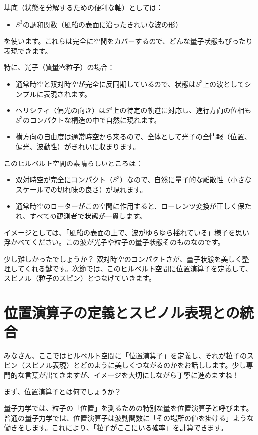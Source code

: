 \documentclass[dvipdfmx,12pt,a4paper]{article}
\begin{document}
基底（状態を分解するための便利な軸）としては：
\begin{itemize}
  \item $S^3$の調和関数（風船の表面に沿ったきれいな波の形）
\end{itemize}
を使います。これらは完全に空間をカバーするので、どんな量子状態もぴったり表現できます。

特に、光子（質量零粒子）の場合：
\begin{itemize}
  \item 通常時空と双対時空が完全に反同期しているので、状態は$S^3$上の波としてシンプルに表現されます。
  \item ヘリシティ（偏光の向き）は$S^3$上の特定の軌道に対応し、進行方向の位相も$S^3$のコンパクトな構造の中で自然に現れます。
  \item 横方向の自由度は通常時空から来るので、全体として光子の全情報（位置、偏光、波動性）がきれいに収まります。
\end{itemize}

このヒルベルト空間の素晴らしいところは：
\begin{itemize}
  \item 双対時空が完全にコンパクト（$S^3$）なので、自然に量子的な離散性（小さなスケールでの切れ味の良さ）が現れます。
  \item 通常時空のローターがこの空間に作用すると、ローレンツ変換が正しく保たれ、すべての観測者で状態が一貫します。
\end{itemize}

イメージとしては、「風船の表面の上で、波がゆらゆら揺れている」様子を思い浮かべてください。この波が光子や粒子の量子状態そのものなのです。

少し難しかったでしょうか？ 双対時空のコンパクトさが、量子状態を美しく整理してくれる鍵です。次節では、このヒルベルト空間に位置演算子を定義して、スピノル（粒子のスピン）とつなげていきます。

\section{位置演算子の定義とスピノル表現との統合}

みなさん、ここではヒルベルト空間に「位置演算子」を定義し、それが粒子のスピン（スピノル表現）とどのように美しくつながるのかをお話しします。少し専門的な言葉が出てきますが、イメージを大切にしながら丁寧に進めますね！

まず、位置演算子とは何でしょうか？

量子力学では、粒子の「位置」を測るための特別な量を位置演算子と呼びます。普通の量子力学では、位置演算子は波動関数に「その場所の値を掛ける」ような働きをします。これにより、「粒子がここにいる確率」を計算できます。
\end{document}
